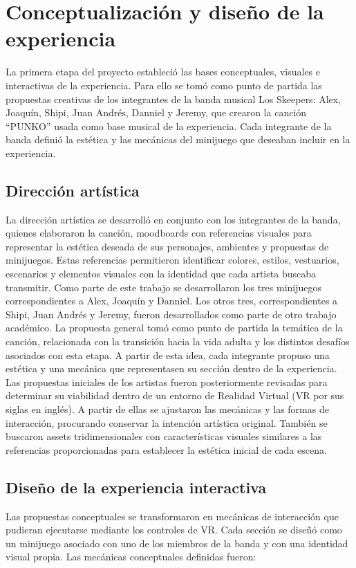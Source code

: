 \section{Conceptualización y diseño de la experiencia}
La primera etapa del proyecto estableció las bases conceptuales, visuales e interactivas de la experiencia. 
Para ello se tomó como punto de partida las propuestas creativas de los integrantes de la banda musical Los Skeepers: Alex, Joaquín, Shipi, Juan Andrés, Danniel y Jeremy, que crearon la canción ``PUNKO'' usada como base musical de la experiencia.
Cada integrante de la banda definió la estética y las mecánicas del minijuego que deseaban incluir en la experiencia. 

\subsection{Dirección artística}
La dirección artística se desarrolló en conjunto con los integrantes de la banda, quienes elaboraron la canción, moodboards con referencias visuales para representar la estética deseada de sus personajes, ambientes y propuestas de minijuegos. 
Estas referencias permitieron identificar colores, estilos, vestuarios, escenarios y elementos visuales con la identidad que cada artista buscaba transmitir. 
Como parte de este trabajo se desarrollaron los tres minijuegos correspondientes a Alex, Joaquín y Danniel. 
Los otros tres, correspondientes a Shipi, Juan Andrés y Jeremy, fueron desarrollados como parte de otro trabajo académico.
La propuesta general tomó como punto de partida la temática de la canción, relacionada con la transición hacia la vida adulta y los distintos desafíos asociados con esta etapa. A partir de esta idea, cada integrante propuso una estética y una mecánica que representasen su sección dentro de la experiencia.
Las propuestas iniciales de los artistas fueron posteriormente revisadas para determinar su viabilidad dentro de un entorno de Realidad Virtual (VR por sus siglas en inglés). A partir de ellas se ajustaron las mecánicas y las formas de interacción, procurando conservar la intención artística original. 
También se buscaron assets tridimensionales con características visuales similares a las referencias proporcionadas para establecer la estética inicial de cada escena. 


\subsection{Diseño de la experiencia interactiva}
Las propuestas conceptuales se transformaron en mecánicas de interacción que pudieran ejecutarse mediante los controles de VR. Cada sección se diseñó como un minijuego asociado con uno de los miembros de la banda y con una identidad visual propia. 
Las mecánicas conceptuales definidas fueron: 

